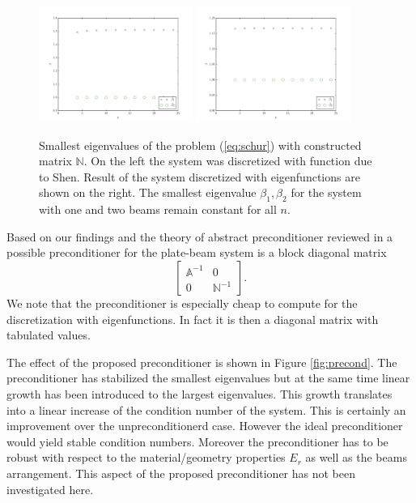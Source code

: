 \documentclass{marine_2015}
\begin{document}
 \begin{figure}[h!]
 \centering
 \includegraphics[width=0.45\textwidth]{img/Schur_precond_shen_cond}
 \includegraphics[width=0.45\textwidth]{img/Schur_precond_sine_cond}\\
 \caption{Smallest eigenvalues of the problem (\ref{eq:schur}) with constructed
 matrix $\mathbb{N}$. On the left the system was discretized with function due
 to Shen. Result of the system discretized with eigenfunctions are shown on the
 right. The smallest eigenvalue $\beta_1, \beta_2$ for the system with one and
 two beams remain constant for all $n$.}
 \label{fig:schur}
 \end{figure}
Based on our findings and the theory of abstract preconditioner reviewed in
\cite{kent} a possible preconditioner for the plate-beam system is a block
diagonal matrix
\[
    \begin{bmatrix}
      \mathbb{A}^{-1} & 0 \\
      0 & \mathbb{N}^{-1}
    \end{bmatrix}.
\]
We note that the preconditioner is especially cheap to compute for the
discretization with eigenfunctions. In fact it is then a diagonal matrix with
tabulated values.

The effect of the proposed preconditioner is shown in Figure \ref{fig:precond}.
The preconditioner has stabilized the smallest eigenvalues but at the same time 
linear growth has been introduced to the largest eigenvalues. This growth translates 
into a linear increase of the condition number of the system. This is certainly an 
improvement over the unpreconditionerd case. However the ideal preconditioner
would yield stable condition numbers. Moreover the preconditioner has to be
robust with respect to the material/geometry properties $E_r$ as well as the
beams arrangement. This aspect of the proposed preconditioner has not been
investigated here.
\end{document}
